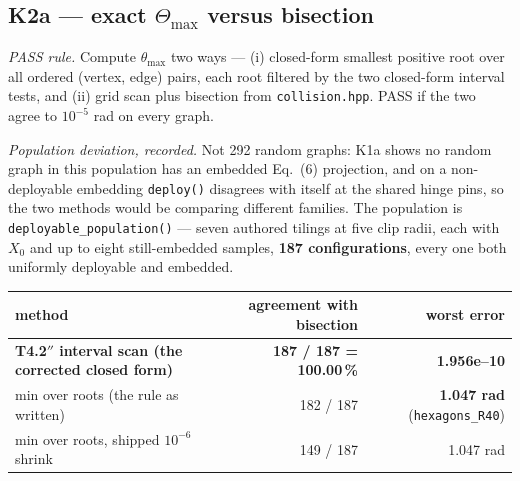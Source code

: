 \documentclass[10pt,a4paper]{article}
\newcommand{\fn}[1]{\nolinkurl{#1}}
\begin{document}
\subsection{K2a --- exact $\Theta_{\max}$ versus bisection}

\emph{PASS rule.} Compute $\theta_{\max}$ two ways --- (i) closed-form smallest positive root over
all ordered (vertex, edge) pairs, each root filtered by the two closed-form interval tests, and
(ii) grid scan plus bisection from \fn{collision.hpp}. PASS if the two agree to $10^{-5}$ rad on
every graph.

\emph{Population deviation, recorded.} Not 292 random graphs: K1a shows no random graph in this
population has an embedded Eq.~(6) projection, and on a non-deployable embedding
\texttt{deploy()} disagrees with itself at the shared hinge pins, so the two methods would be
comparing different families. The population is \fn{deployable_population()} --- seven authored
tilings at five clip radii, each with $X_0$ and up to eight still-embedded samples, \textbf{187
configurations}, every one both uniformly deployable and embedded.

\begin{center}\small
\begin{tabular}{@{}lrr@{}}
\toprule
method & agreement with bisection & worst error \\
\midrule
\textbf{T4.2$''$ interval scan (the corrected closed form)} & \textbf{187 / 187 = 100.00\,\%} & \textbf{1.956e--10} \\
min over roots (the rule as written) & 182 / 187 & \textbf{1.047 rad} (\fn{hexagons_R40}) \\
min over roots, shipped $10^{-6}$ shrink & 149 / 187 & 1.047 rad \\
\bottomrule
\end{tabular}
\end{center}
\end{document}
